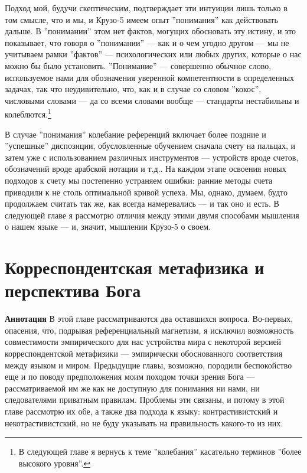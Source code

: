 \documentclass[11pt]{book}
\begin{document}
Подход мой, будучи скептическим, подтверждает эти интуиции лишь только в том смысле, что и мы, и Крузо-5 имеем опыт ''понимания'' как действовать дальше. В ''понимании'' этом нет фактов, могущих обосновать эту истину, и это показывает, что говоря о ''понимании'' --- как и о чем угодно другом --- мы не учитываем рамки ''фактов'' --- психологических или любых других, которые о нас можно бы было установить. ''Понимание'' --- совершенно обычное слово, используемое нами для обозначения уверенной компетентности в определенных задачах, так что неудивительно, что, как и в случае со словом ''кокос'', числовыми словами --- да со всеми словами вообще --- стандарты нестабильны и колеблются.\footnote{В следующей главе я вернусь к теме ''колебания'' касательно терминов ''более высокого уровня''.}

В случае ''понимания'' колебание референций включает более поздние и ''успешные'' диспозиции, обусловленные обучением сначала счету на пальцах, и затем уже с использованием различных инструментов --- устройств вроде счетов, обозначений вроде арабской нотации и т.д.. На каждом этапе освоения новых подходов к счету мы постепенно устраняем ошибки: ранние методы счета приводили к не столь оптимальной кривой успеха. Мы, однако, думаем, будто продолжаем считать так же, как всегда намеревались --- и так оно и есть. В следующей главе я рассмотрю отличия между этими двумя способами мышления о нашем языке --- и, значит, мышлении Крузо-5 о своем.

\chapter{Корреспондентская метафизика и перспектива Бога}

\qquad

\textbf{Аннотация} \quad В этой главе рассматриваются два оставшихся вопроса. Во-первых, опасения, что, подрывая референциальный магнетизм, я исключил возможность совместимости эмпирического для нас устройства мира с некоторой версией корреспондентской метафизики --- эмпирически обоснованного соответствия между языком и миром. Предыдущие главы, возможно, породили беспокойство еще и по поводу предположения моим походом точки зрения Бога --- рассматриваемой им же как не доступную для понимания ни нами, ни следователями приватным правилам. Проблемы эти связаны, и потому в этой главе рассмотрю их обе, а также два подхода к языку: контрастивистский и некотрастивистский, но не буду указывать на правильность какого-то из них.

\qquad
\end{document}
